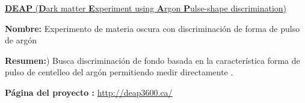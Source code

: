 \href{https://en.wikipedia.org/wiki/DEAP}{\textbf{DEAP} (\textbf{D}ark matter \textbf{E}xperiment using \textbf{A}rgon \textbf{P}ulse-shape discrimination)}
\begin{itemize_f}
\item \textbf{Nombre:} Experimento de materia oscura con discriminación de forma de pulso de argón
\item \textbf{Resumen:}) Busca discriminación de fondo basada en la característica forma de pulso de centelleo del argón permitiendo medir directamente \WIMP.
\item \textbf{Página del proyecto :} \href{http://deap3600.ca/}{http://deap3600.ca/}
\end{itemize_f}

%
%
%
